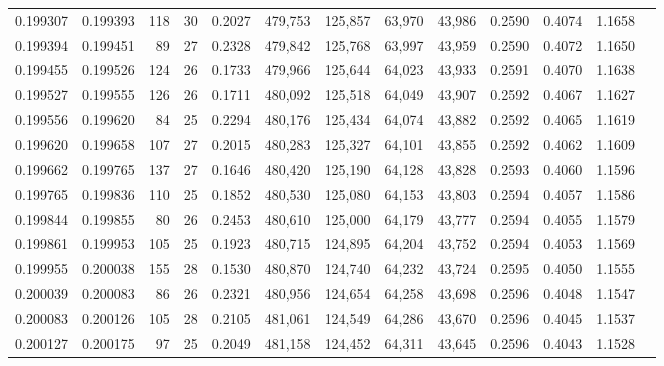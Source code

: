 \begin{tabular}{rrrrrrrrrrrrr}
0.199307 & 0.199393 & 118 &  30 &                                     0.2027 & 479,753 & 125,857 &  63,970 &  43,986 & 0.2590 & 0.4074 & 1.1658 \\
0.199394 & 0.199451 &  89 &  27 &                                     0.2328 & 479,842 & 125,768 &  63,997 &  43,959 & 0.2590 & 0.4072 & 1.1650 \\
0.199455 & 0.199526 & 124 &  26 &                                     0.1733 & 479,966 & 125,644 &  64,023 &  43,933 & 0.2591 & 0.4070 & 1.1638 \\
0.199527 & 0.199555 & 126 &  26 &                                     0.1711 & 480,092 & 125,518 &  64,049 &  43,907 & 0.2592 & 0.4067 & 1.1627 \\
0.199556 & 0.199620 &  84 &  25 &                                     0.2294 & 480,176 & 125,434 &  64,074 &  43,882 & 0.2592 & 0.4065 & 1.1619 \\
0.199620 & 0.199658 & 107 &  27 &                                     0.2015 & 480,283 & 125,327 &  64,101 &  43,855 & 0.2592 & 0.4062 & 1.1609 \\
0.199662 & 0.199765 & 137 &  27 &                                     0.1646 & 480,420 & 125,190 &  64,128 &  43,828 & 0.2593 & 0.4060 & 1.1596 \\
0.199765 & 0.199836 & 110 &  25 &                                     0.1852 & 480,530 & 125,080 &  64,153 &  43,803 & 0.2594 & 0.4057 & 1.1586 \\
0.199844 & 0.199855 &  80 &  26 &                                     0.2453 & 480,610 & 125,000 &  64,179 &  43,777 & 0.2594 & 0.4055 & 1.1579 \\
0.199861 & 0.199953 & 105 &  25 &                                     0.1923 & 480,715 & 124,895 &  64,204 &  43,752 & 0.2594 & 0.4053 & 1.1569 \\
0.199955 & 0.200038 & 155 &  28 &                                     0.1530 & 480,870 & 124,740 &  64,232 &  43,724 & 0.2595 & 0.4050 & 1.1555 \\
0.200039 & 0.200083 &  86 &  26 &                                     0.2321 & 480,956 & 124,654 &  64,258 &  43,698 & 0.2596 & 0.4048 & 1.1547 \\
0.200083 & 0.200126 & 105 &  28 &                                     0.2105 & 481,061 & 124,549 &  64,286 &  43,670 & 0.2596 & 0.4045 & 1.1537 \\
0.200127 & 0.200175 &  97 &  25 &                                     0.2049 & 481,158 & 124,452 &  64,311 &  43,645 & 0.2596 & 0.4043 & 1.1528 \\

\end{tabular}
